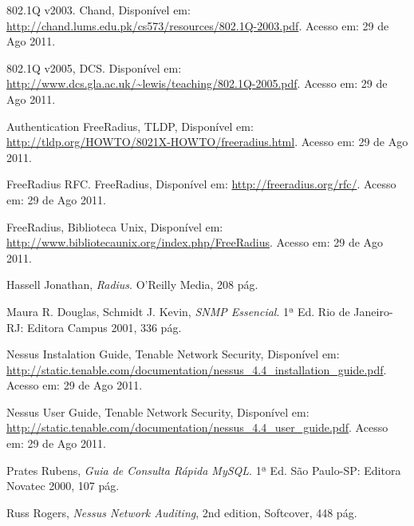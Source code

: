 \documentclass[brazil, ruledheader, pnumromarab,normaltoc]{abnt}
\begin{document}
%
%

\begin{thebibliography}{100} %
\addtolength{\leftmargin}{0.2in} %

 802.1Q v2003. Chand, Disponível em: \url{http://chand.lums.edu.pk/cs573/resources/802.1Q-2003.pdf}. Acesso em: 29 de Ago 2011.

 802.1Q v2005, DCS. Disponível em: \url{http://www.dcs.gla.ac.uk/~lewis/teaching/802.1Q-2005.pdf}. Acesso em: 29 de Ago 2011.

 Authentication FreeRadius, TLDP, Disponível em: \url{http://tldp.org/HOWTO/8021X-HOWTO/freeradius.html}. Acesso em: 29 de Ago 2011.

 FreeRadius RFC. FreeRadius, Disponível em: \url{http://freeradius.org/rfc/}. Acesso em: 29 de Ago 2011.

 FreeRadius, Biblioteca Unix, Disponível em: \url{http://www.bibliotecaunix.org/index.php/FreeRadius}. Acesso em: 29 de Ago 2011.

 Hassell Jonathan, \emph{Radius}. O'Reilly Media, 208 pág.

 Maura R. Douglas, Schmidt J. Kevin, \emph{SNMP Essencial}. 1ª Ed. Rio de Janeiro-RJ: Editora Campus 2001, 336 pág.

 Nessus Instalation Guide, Tenable Network Security, Disponível em: \url{http://static.tenable.com/documentation/nessus_4.4_installation_guide.pdf}. Acesso em: 29 de Ago 2011.

 Nessus User Guide, Tenable Network Security, Disponível em: \url{http://static.tenable.com/documentation/nessus_4.4_user_guide.pdf}. Acesso em: 29 de Ago 2011.

 Prates Rubens, \emph{Guia de Consulta Rápida MySQL}. 1ª Ed. São Paulo-SP: Editora Novatec 2000, 107 pág.

 Russ Rogers, \emph{Nessus Network Auditing}, 2nd edition, Softcover, 448 pág.


\end{thebibliography}
\end{document}
